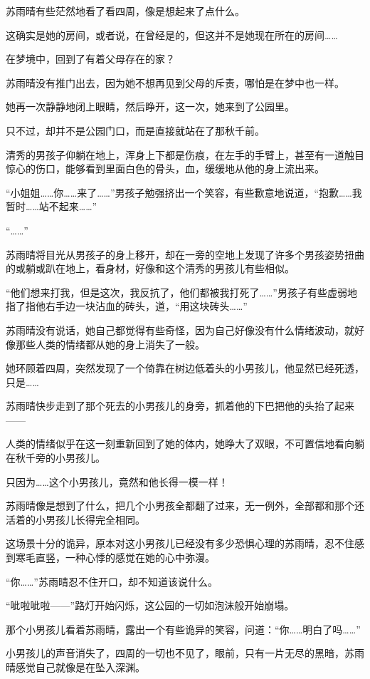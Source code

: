 苏雨晴有些茫然地看了看四周，像是想起来了点什么。

这确实是她的房间，或者说，在曾经是的，但这并不是她现在所在的房间……

在梦境中，回到了有着父母存在的家？

苏雨晴没有推门出去，因为她不想再见到父母的斥责，哪怕是在梦中也一样。

她再一次静静地闭上眼睛，然后睁开，这一次，她来到了公园里。

只不过，却并不是公园门口，而是直接就站在了那秋千前。

清秀的男孩子仰躺在地上，浑身上下都是伤痕，在左手的手臂上，甚至有一道触目惊心的伤口，能够看到里面白色的骨头，血，缓缓地从他的身上流出来。

“小姐姐……你……来了……”男孩子勉强挤出一个笑容，有些歉意地说道，“抱歉……我暂时……站不起来……”

“……”

苏雨晴将目光从男孩子的身上移开，却在一旁的空地上发现了许多个男孩姿势扭曲的或躺或趴在地上，看身材，好像和这个清秀的男孩儿有些相似。

“他们想来打我，但是这次，我反抗了，他们都被我打死了……”男孩子有些虚弱地指了指他右手边一块沾血的砖头，道，“用这块砖头……”

苏雨晴没有说话，她自己都觉得有些奇怪，因为自己好像没有什么情绪波动，就好像那些人类的情绪都从她的身上消失了一般。

她环顾着四周，突然发现了一个倚靠在树边低着头的小男孩儿，他显然已经死透，只是……

苏雨晴快步走到了那个死去的小男孩儿的身旁，抓着他的下巴把他的头抬了起来——

人类的情绪似乎在这一刻重新回到了她的体内，她睁大了双眼，不可置信地看向躺在秋千旁的小男孩儿。

只因为……这个小男孩儿，竟然和他长得一模一样！

苏雨晴像是想到了什么，把几个小男孩全都翻了过来，无一例外，全部都和那个还活着的小男孩儿长得完全相同。

这场景十分的诡异，原本对这小男孩儿已经没有多少恐惧心理的苏雨晴，忍不住感到寒毛直竖，一种心悸的感觉在她的心中弥漫。

“你……”苏雨晴忍不住开口，却不知道该说什么。

“呲啦呲啦——”路灯开始闪烁，这公园的一切如泡沫般开始崩塌。

那个小男孩儿看着苏雨晴，露出一个有些诡异的笑容，问道：“你……明白了吗……”

小男孩儿的声音消失了，四周的一切也不见了，眼前，只有一片无尽的黑暗，苏雨晴感觉自己就像是在坠入深渊。

